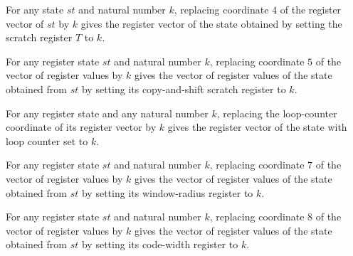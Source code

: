 \begin{lemma}
\label{Complexity.LogProg.SavitchARM.St.upd_T}
\leanok
{}
For any state $st$ and natural number $k$, replacing coordinate $4$ of the register
vector of $st$ by $k$ gives the register vector of the state obtained by setting the
scratch register $T$ to $k$.
\end{lemma}

\begin{lemma}
\label{Complexity.LogProg.SavitchARM.St.upd_Z}
\leanok
{}
For any register state $st$ and natural number $k$, replacing coordinate $5$ of the
vector of register values by $k$ gives the vector of register values of the state
obtained from $st$ by setting its copy-and-shift scratch register to $k$.
\end{lemma}

\begin{lemma}
\label{Complexity.LogProg.SavitchARM.St.upd_C}
\leanok
{}
For any register state and any natural number $k$, replacing the loop-counter coordinate
of its register vector by $k$ gives the register vector of the state with loop counter
set to $k$.
\end{lemma}

\begin{lemma}
\label{Complexity.LogProg.SavitchARM.St.upd_s}
\leanok
{}
For any register state $st$ and natural number $k$, replacing coordinate $7$ of the
vector of register values by $k$ gives the vector of register values of the state
obtained from $st$ by setting its window-radius register to $k$.
\end{lemma}

\begin{lemma}
\label{Complexity.LogProg.SavitchARM.St.upd_w}
\leanok
{}
For any register state $st$ and natural number $k$, replacing coordinate $8$ of the
vector of register values by $k$ gives the vector of register values of the state
obtained from $st$ by setting its code-width register to $k$.
\end{lemma}

